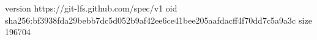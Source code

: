 version https://git-lfs.github.com/spec/v1
oid sha256:bf3938fda29bebb7dc5d052b9af42ee6ce41bee205aafdacff4f70dd7c5a9a3c
size 196704
